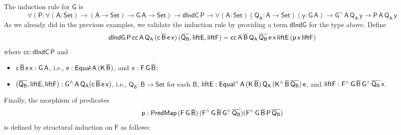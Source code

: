 \documentclass[9pt]{entcs} \usepackage{entcsmacro}
\begin{document}
The induction rule for $\mathsf{G}$ is
\[
\mathsf{\forall (P : \forall (A : Set) \to (A \to Set) \to G\,A \to Set) \to dIndC\,P
\to \forall (A : Set)(Q_A : A \to Set)(y : G\,A) \to G^{\wedge}\,A\,Q_A\,y \to P\,A\,Q_A\,y}
\]
As we already did in the previous examples,
we validate the induction rule by providing a term $\mathsf{dIndG}$ for the type above.
Define
\[
\mathsf{dIndG\,P\,cc\,A\,Q_A\,(c\,\overline{B}\,e\,x)\,(\overline{Q_B}, liftE, liftF)
= cc\,A\,\overline{B}\,Q_A\,\overline{Q_B}\,e\,x\,liftE\,(p\,x\,liftF)}
\]
where $\mathsf{cc : dIndC\,P}$ and
\begin{itemize}
\item $\mathsf{c\,\overline{B}\,e\,x : G\,A}$,
i.e., $\mathsf{e : Equal\,A\,(K\,\overline{B})}$,
and $\mathsf{x : F\,G\,\overline{B}}$;
\item $\mathsf{(\overline{Q_B}, liftE, liftF) : G^{\wedge}\,A\,Q_A (c\,\overline{B}\,e\,x)}$,
i.e.,
$\mathsf{Q_B : B \to Set}$ for each $\mathsf{B}$,
$\mathsf{liftE : Equal^{\wedge}\,A\,(K\,\overline{B})\,Q_A\,(K^{\wedge}\,\overline{B}\,\overline{Q_B})\,e}$,
and $\mathsf{liftF : F^{\wedge}\,G\,\overline{B}\,G^{\wedge}\,{\overline{Q_B}}\,x}$.
\end{itemize}
Finally, the morphism of predicates
\[
\mathsf{p : PredMap\,(F\,G\,\overline{B})\,(F^{\wedge}\,G\,\overline{B}\,G^{\wedge}\,\overline{Q_B}) (F^{\wedge}\,G\,\overline{B}\,P\,\overline{Q_B})}
\]
is defined by structural induction on $\mathsf{F}$ as follows:
\end{document}
